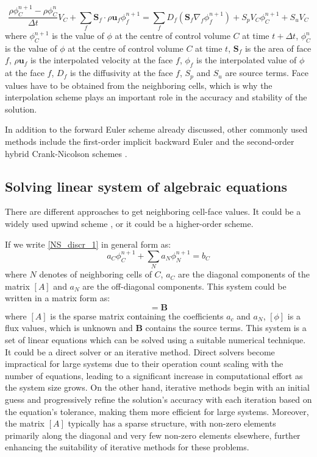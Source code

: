 \begin{equation} \label{NS_discr_1}
\frac{\rho\phi^{n+1}_C - \rho\phi^{n}_C}{\Delta t} V_{C}+\sum_{f} \mathbf{S}_{f} \cdot \rho\mathbf{u}_{f}\phi_f^{n+1} =\sum_{f} D_f\left(\mathbf{S}_{f} \nabla_{f} \phi_f^{n+1}\right)+ S_p V_C\phi^{n+1}_C +S_u V_C
\end{equation}
where $\phi^{n+1}_C$ is the value of $\phi$ at the centre of control volume $C$ at time $t+\Delta t$, $\phi^{n}_C$ is the value of $\phi$ at the centre of control volume $C$ at time $t$, $\mathbf{S}_{f}$ is the area of face $f$, $\rho\mathbf{u}_{f}$ is the interpolated velocity at the face $f$, $\phi_f$ is the interpolated value of $\phi$ at the face $f$, $D_f$ is the diffusivity at the face $f$, $S_p$ and $S_u$ are source terms. Face values have to be obtained from the neighboring cells, which is why the interpolation scheme plays an important role in the accuracy and stability of the solution.

In addition to the forward Euler scheme already discussed, other commonly used methods include the first-order implicit backward Euler and the second-order hybrid Crank-Nicolson schemes \cite{sun2006efficient}.

\subsection{Solving linear system of algebraic equations}
There are different approaches to get neighboring cell-face values. It could be a widely used upwind scheme \cite{leonard1979stable}, or it could be a higher-order scheme.

If we write \ref{NS_discr_1} in general form as:
\begin{equation}
a_{C} \phi_{C}^{n+1}+\sum_{N} a_{N} \phi_{N}^{n+1}=b_{C}
\end{equation}
where $N$ denotes of neighboring cells of $C$,  $a_C$ are the diagonal components of the matrix $[A]$ and $a_N$ are the off-diagonal components. This system could be written in a matrix form as:
\begin{equation}
[A][\phi]=\mathbf{B}
\end{equation}
where $[A]$ is the sparse matrix containing the coefficients $a_c$ and $a_N$, $[\phi]$ is a flux values, which is unknown and $\mathbf{B}$ contains the source terms. This system is a set of linear equations which can be solved using a suitable numerical technique. It could be a direct solver or an iterative method. Direct solvers become impractical for large systems due to their operation count scaling with the number of equations, leading to a significant increase in computational effort as the system size grows. On the other hand, iterative methods begin with an initial guess and progressively refine the solution's accuracy with each iteration based on the equation's tolerance, making them more efficient for large systems. Moreover, the matrix $[A]$ typically has a sparse structure, with non-zero elements primarily along the diagonal and very few non-zero elements elsewhere, further enhancing the suitability of iterative methods for these problems.

